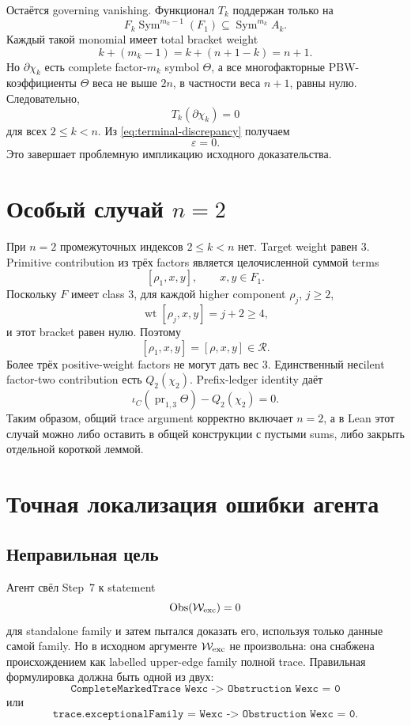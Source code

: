 \documentclass[11pt,a4paper]{article}
\theoremstyle{definition}
\theoremstyle{remark}
\newcommand{\Sym}{\operatorname{Sym}}
\newcommand{\pr}{\operatorname{pr}}
\newcommand{\Rel}{\mathcal R}
\newcommand{\Obs}{\operatorname{Obs}}
\newcommand{\wt}{\operatorname{wt}}
\newcommand{\eps}{\varepsilon}
\begin{document}
Остаётся governing vanishing. Функционал $T_k$ поддержан только на
\[
 F_k\Sym^{m_k-1}(F_1)\subseteq\Sym^{m_k}A_k.
\]
Каждый такой monomial имеет total bracket weight
\[
 k+(m_k-1)=k+(n+1-k)=n+1.
\]
Но $\partial\chi_k$ есть complete factor-$m_k$ symbol $\Theta$, а все
многофакторные PBW-коэффициенты $\Theta$ веса не выше $2n$, в частности веса
$n+1$, равны нулю. Следовательно,
\[
 T_k(\partial\chi_k)=0
\]
для всех $2\le k<n$. Из \eqref{eq:terminal-discrepancy} получаем
\[
 \eps=0.
\]
Это завершает проблемную импликацию исходного доказательства.

\section{Особый случай $n=2$}

При $n=2$ промежуточных индексов $2\le k<n$ нет. Target weight равен $3$.
Primitive contribution из трёх factors является целочисленной суммой terms
\[
 [\rho_1,x,y],\qquad x,y\in F_1.
\]
Поскольку $F$ имеет class $3$, для каждой higher component $\rho_j$, $j\ge2$,
\[
 \wt[\rho_j,x,y]=j+2\ge4,
\]
и этот bracket равен нулю. Поэтому
\[
 [\rho_1,x,y]=[\rho,x,y]\in\Rel.
\]
Более трёх positive-weight factors не могут дать вес $3$. Единственный
несilent factor-two contribution есть $Q_2(\chi_2)$. Prefix-ledger identity
даёт
\[
 \iota_C(\pr_{1,3}\Theta)-Q_2(\chi_2)=0.
\]
Таким образом, общий trace argument корректно включает $n=2$, а в Lean этот
случай можно либо оставить в общей конструкции с пустыми sums, либо закрыть
отдельной короткой леммой.

\section{Точная локализация ошибки агента}

\subsection{Неправильная цель}

Агент свёл Step~7 к statement
\[
 \Obs(\mathcal W_{\rm exc})=0
\]
для standalone family и затем пытался доказать его, используя только данные
самой family. Но в исходном аргументе $\mathcal W_{\rm exc}$ не произвольна:
она снабжена происхождением как labelled upper-edge family полной trace.
Правильная формулировка должна быть одной из двух:
\[
 \texttt{CompleteMarkedTrace Wexc -> Obstruction Wexc = 0}
\]
или
\[
 \texttt{trace.exceptionalFamily = Wexc -> Obstruction Wexc = 0}.
\]
\end{document}
